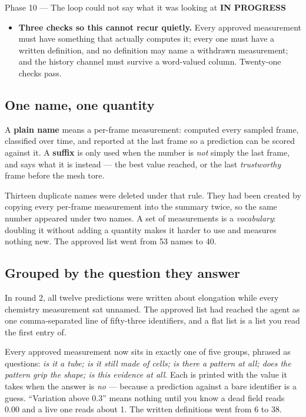 \documentclass[11pt,a4paper]{article}
\newcommand{\code}[1]{\texttt{#1}}
\newcommand{\prog}{\textcolor{warn}{\textbf{IN PROGRESS}}}
\begin{document}
\begin{phasebox}{Phase 10 --- The loop could not say what it was looking at \hfill \prog}
\begin{itemize}
      describes a gentle rise and fall \emph{and} a spike to seventeen thousand followed by
      extinction, and only the numbers say which. That run now reads
      \code{0 0 0 0 1 0.013 0 0} for the fraction of switched-on cells: the flash Cedric saw,
      written down.
\item \textbf{Three checks so this cannot recur quietly.} Every approved measurement must have
      something that actually computes it; every one must have a written definition, and no
      definition may name a withdrawn measurement; and the history channel must survive a
      word-valued column. Twenty-one checks pass.
\end{itemize}

\subsection*{One name, one quantity}
A \textbf{plain name} means a per-frame measurement: computed every sampled frame, classified over
time, and reported at the last frame so a prediction can be scored against it. A \textbf{suffix}
is only used when the number is \emph{not} simply the last frame, and says what it is instead ---
the best value reached, or the last \emph{trustworthy} frame before the mesh tore.

Thirteen duplicate names were deleted under that rule. They had been created by copying every
per-frame measurement into the summary twice, so the same number appeared under two names. A set
of measurements is a \emph{vocabulary}: doubling it without adding a quantity makes it harder to
use and measures nothing new. The approved list went from 53 names to 40.

\subsection*{Grouped by the question they answer}
In round 2, all twelve predictions were written about elongation while every chemistry measurement
sat unnamed. The approved list had reached the agent as one comma-separated line of fifty-three
identifiers, and a flat list is a list you read the first entry of.

Every approved measurement now sits in exactly one of five groups, phrased as questions:
\emph{is it a tube; is it still made of cells; is there a pattern at all; does the pattern grip
the shape; is this evidence at all}. Each is printed with the value it takes when the answer is
\emph{no} --- because a prediction against a bare identifier is a guess. ``Variation above 0.3''
means nothing until you know a dead field reads 0.00 and a live one reads about 1. The written
definitions went from 6 to 38.


\end{phasebox}
\end{document}
